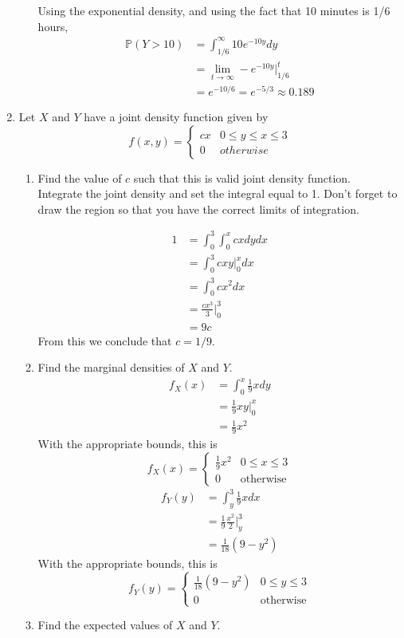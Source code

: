 \documentclass[12pt]{article}
\def\P{{\mathbb P}}
\begin{document}
\begin{enumerate}
\begin{enumerate}
Using the exponential density, and using the fact that 10 minutes is 1/6 hours,
\begin{align*}
\P(Y > 10) &= \int_{1/6}^\infty 10 e^{-10 y} dy \\
&= \lim_{t\rightarrow\infty}-e^{-10y}\Bigr|_{1/6}^t \\
&= e^{-10/6} = e^{-5/3} \approx 0.189
\end{align*}

\end{enumerate}

\item Let $X$ and $Y$ have a joint density function given by
\[
f(x,y) = \begin{cases}
c x & 0 \leq y \leq x \leq 3 \\
0 & otherwise
\end{cases}
\]
\begin{enumerate}
\item Find the value of $c$ such that this is valid joint density function.\\

Integrate the joint density and set the integral equal to 1. Don't forget to draw the region so that you have the correct limits of integration.

\begin{align*}
1 &= \int_0^3 \int_0^x c x dy dx \\
&= \int_0^3 c x y \Bigr|_0^x dx \\
&= \int_0^3 c x^2 dx \\
&= \frac{c x^3}{3}\Bigr|_0^3 \\
&= 9c
\end{align*}
From this we conclude that $c = 1/9$.

\item Find the marginal densities of $X$ and $Y$.\\

\begin{align*}
f_X(x) &= \int_0^x \frac{1}{9} x dy \\
&= \frac{1}{9}xy\Bigr|_0^x \\
&= \frac{1}{9}x^2 
\end{align*}
With the appropriate bounds, this is
\[
f_X(x) = \begin{cases}
\frac{1}{9}x^2 & 0 \leq x \leq 3 \\
0 & \text{otherwise}
\end{cases}
\]
\begin{align*}
f_Y(y) &= \int_y^3 \frac{1}{9} x dx \\
&= \frac{1}{9}\frac{x^2}{2}\Bigr|_y^3 \\
&= \frac{1}{18}(9 - y^2) 
\end{align*}
With the appropriate bounds, this is
\[
f_Y(y) = \begin{cases}
\frac{1}{18}(9 - y^2) & 0 \leq y \leq 3 \\
0 & \text{otherwise}
\end{cases}
\]
\item Find the expected values of $X$ and $Y$.\\


\end{enumerate}
\end{enumerate}
\end{document}
